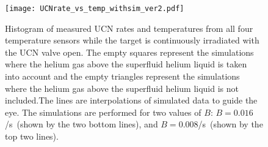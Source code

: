 


\begin{figure}[h!]
  \centering
  \texttt{[image: UCNrate\_vs\_temp\_withsim\_ver2.pdf]}
  \caption[UCN rate versus superfluid helium temperature data and
  simulations]{Histogram of measured UCN rates and temperatures from
    all four temperature sensors while the target is continuously
    irradiated with the UCN valve open. The empty squares represent
    the simulations where the helium gas above the superfluid helium
    liquid is taken into account and the empty triangles represent the
    simulations where the helium gas above the superfluid helium
    liquid is not included.The lines are interpolations of simulated
    data to guide the eye. The simulations are performed for two
    values of $B$: $B = 0.016$/s~(shown by the two bottom lines), and
    $B = 0.008$/s~(shown by the top two lines). }
  \label{fig:rate_vs_temp_sim}
\end{figure}


